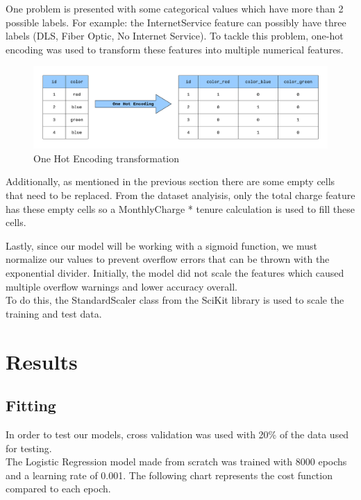 \documentclass[letterpaper, 10 pt, conference]{ieeeconf}
\begin{document}
One problem is presented with some categorical values which have more than 2 possible labels. For example: the InternetService feature can possibly
have three labels (DLS, Fiber Optic, No Internet Service). To tackle this problem, one-hot encoding was used to transform these features into multiple 
numerical features. \\

\begin{figure}[thpb]
    \centering
    \includegraphics[scale=0.2]{figures/one_hot.png}
    \caption{One Hot Encoding transformation}
    \label{one_hot}
 \end{figure}

Additionally, as mentioned in the previous section there are some empty cells that need to be replaced. From the dataset analyisis, only the total charge feature has
these empty cells so a MonthlyCharge * tenure calculation is used to fill these cells.


Lastly, since our model will be working with a sigmoid function, we must normalize our values to prevent overflow errors that can be thrown with the exponential divider.
Initially, the model did not scale the features which caused multiple overflow warnings and lower accuracy overall. \\

To do this, the StandardScaler class from the SciKit library is used to scale the training and test data.

\section{ Results }

\subsection{ Fitting }
In order to test our models, cross validation was used with 20\% of the data used for testing. \\

The Logistic Regression model made from scratch was trained with 8000 epochs and a learning rate of 0.001. The following chart represents the
cost function compared to each epoch.
\end{document}
